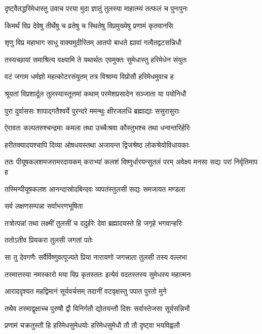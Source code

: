 \twolineshloka
{दृष्ट्वैतद्धरिमेधास्तु उवाच परया मुदा}
{ज्ञातुं तुलस्या माहात्म्यं तत्फलं च पुनःपुनः} %

\twolineshloka
{किमर्थं विप्र देवेषु तीर्थेषु च व्रतेषु च}
{स्थितेषु विप्रमुख्येषु प्रणामं कृतवानसि} %


\twolineshloka
{शृणु विप्र महाभाग साधु वाक्यमुदीरितम्}
{आतपो बाधते ह्यावां गत्वैतद्वटसन्निधौ} %

\twolineshloka
{तस्यच्छायां समाश्रित्य वक्ष्यामि ते यथार्थतः}
{एवमुक्तः सुमेधास्तु हरिमेधेन संयुतः} %

\twolineshloka
{वटं जगाम धर्मज्ञो महत्कोटरसंयुतम्}
{तत्र विश्राम्य विप्रोसौ हरिमेधमुवाच ह} %

\twolineshloka
{श्रूयतां विप्रशार्दूल तुलस्यास्तूत्तमां कथाम्}
{परमेशप्रसादेन सञ्जाता या पयोनिधौ} %

\twolineshloka
{पुरा दुर्वाससः शापाद्गतैश्वर्ये पुरन्दरे}
{ममन्थुः क्षीरजलधिं ब्रह्माद्याः ससुरासुराः} %

\twolineshloka
{ऐरावतः कल्पतरुश्चन्द्रमाः कमला तथा}
{उच्चैःश्रवा कौस्तुभश्च तथा धन्वन्तरिर्हरिः} %

\twolineshloka
{हरीतक्यादयश्चापि दिव्या ओषधयस्तथा}
{अजायन्त द्विजश्रेष्ठ लोकश्रेयोविधायकाः} %

\threelineshloka
{ततः पीयूषकलशमजरामरदायकम्}
{कराभ्यां कलशं विष्णुर्धारयन्सुतलं परम्}
{अवेक्ष्य मनसा सद्यः परां निर्वृतिमाप ह} %

\twolineshloka
{तस्मिन्पीयूषकलश आनन्दास्रोदबिन्दवः}
{व्यपतंस्तुलसी सद्यः समजायत मण्डला} %


\onelineshloka
{सर्व लक्षणसम्पन्ना सर्वाभरणभूषिता} %

\twolineshloka
{तत्रोत्पन्नां तथा लक्ष्मीं तुलसीं च ददुर्हरेः}
{देवा ब्रह्मादयस्ते हि जगृहे भगवान्हरिः} %


\onelineshloka
{ततोऽतीव प्रियकरा तुलसी जगतां पतेः} %

\twolineshloka
{सा तु देवगणैः सर्वैर्विष्णुवत्पूज्यते प्रिया}
{नारायणो जगत्त्राता तुलसी तस्य वल्लभा} %

\twolineshloka
{तस्मात्तस्या नमस्कारो मया विप्र कृतस्ततः}
{इत्येवं वदतस्तस्य सुमेधस्य महात्मनः} %

\twolineshloka
{आराददृश्यत महद्विमानं सूर्यवर्चसम्}
{तदानीं वटवृक्षस्तु पपात पुरतो मुने} %

\twolineshloka
{तथैव तस्माद्वृक्षाच्च पुरुषौ द्वौ विनिर्गतौ}
{द्योतयन्तौ दिशः सर्वास्तेजसा सूर्यसन्निभौ} %

\twolineshloka
{प्रणामं चक्रतुस्तौ हि हरिमेधसुमेधयोः}
{हरिमेधसुमेधौ तौ तौ दृष्ट्वा भयविह्वलौ} %


